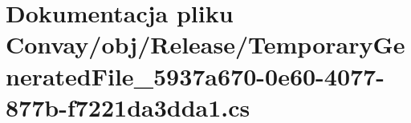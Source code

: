 \hypertarget{_convay_2obj_2_release_2_temporary_generated_file__5937a670-0e60-4077-877b-f7221da3dda1_8cs}{}\section{Dokumentacja pliku Convay/obj/\+Release/\+Temporary\+Generated\+File\+\_\+5937a670-\/0e60-\/4077-\/877b-\/f7221da3dda1.cs}
\label{_convay_2obj_2_release_2_temporary_generated_file__5937a670-0e60-4077-877b-f7221da3dda1_8cs}
